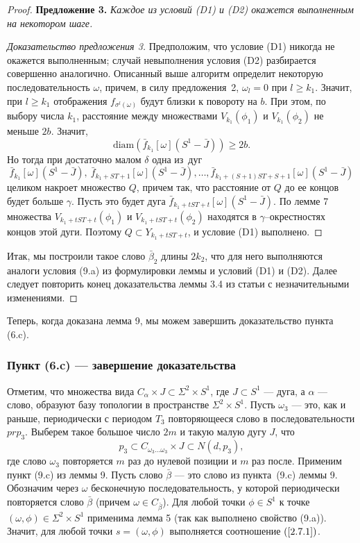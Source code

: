 \documentclass[12pt]{article}
\begin{document}
\begin{proof}
\textbf{Предложение 3.}
\textit{
Каждое из условий (D1) и (D2) окажется выполненным на некотором шаге.
}

\begin{proof}[Доказательство предложения 3] 
Предположим, что условие (D1) никогда не окажется выполненным; случай невыполнения условия (D2) разбирается совершенно аналогично. Описанный выше алгоритм определит некоторую последовательность $\omega$, причем, в силу предложения~2, $\omega_l=0$ при $l\geq k_1$. Значит, при $l\geq k_1$ отображения $f_{\sigma^l(\omega)}$ будут близки к повороту на $b$. При этом, по выбору числа $k_1$, расстояние между множествами $V_{k_1}(\phi_1)$ и $V_{k_1}(\phi_2)$ не меньше $2b$. Значит,
$$\textrm{diam}(\bar{f}_{k_1}[\omega](S^1-\bar{J}))\geq 2b.$$
Но тогда при достаточно малом $\delta$ одна из~дуг
$$\bar{f}_{k_1}[\omega](S^1-\bar{J}),\ \bar{f}_{k_1+ST+1}[\omega](S^1-\bar{J}),\ldots,\bar{f}_{k_1+(S+1)ST+S+1}[\omega](S^1-\bar{J})$$ 
 целиком накроет множество $Q$, причем так, что расстояние от $Q$ до ее концов будет больше $\gamma$. Пусть это будет дуга $\bar{f}_{k_1+tST+t}[\omega](S^1-\bar{J})$. По лемме 7 множества $V_{k_1+tST+t}(\phi_1)$ и $V_{k_1+tST+t}(\phi_2)$ находятся в $\gamma$--окрестностях концов этой дуги. Поэтому $Q\subset Y_{k_1+tST+t}$, и условие (D1) выполнено.
 \end{proof}
 
 Итак, мы построили такое слово $\bar{\beta}_2$ длины $2k_2$, что для него выполняются аналоги условия (9.a) из формулировки леммы и условий (D1) и (D2).
 Далее следует повторить конец доказательства леммы 3.4 из статьи \cite{17} с незначительными изменениями. %
 \end{proof}
 
  Теперь, когда доказана лемма 9, мы можем завершить доказательство пункта (6.c).
 
\subsubsection{Пункт (6.c) --- завершение доказательства}

Отметим, что множества вида $C_{\alpha}\times J\subset\Sigma^2\times S^1$, где $J\subset S^1$ --- дуга, а $\alpha$ --- слово, образуют базу топологии в пространстве $\Sigma^2\times S^1$.
Пусть $\omega_3$ --- это, как и раньше, периодически с периодом $T_3$ повторяющееся слово в последовательности $pr p_3$. Выберем такое большое число $2m$ и такую малую дугу $J$, что
$$p_3\subset C_{\omega_3\ldots\omega_3}\times J\subset N(d,p_3),$$
где слово $\omega_3$ повторяется $m$ раз до нулевой позиции и $m$ раз после. Применим пункт (9.c) из леммы 9. Пусть слово $\bar{\beta}$ --- это слово из пункта~(9.c) леммы 9. Обозначим через $\omega$ бесконечную последовательность, у которой периодически повторяется слово $\bar{\beta}$ (причем $\omega\in C_{\bar{\beta}}$). Для любой точки $\phi\in S^1$ к точке $(\omega,\phi)\in\Sigma^2\times S^1$ применима лемма 5 (так как выполнено свойство (9.a)). Значит, для любой точки $s=(\omega,\phi)$ выполняется соотношение $(\ref{2.7.1})$.
\end{document}
